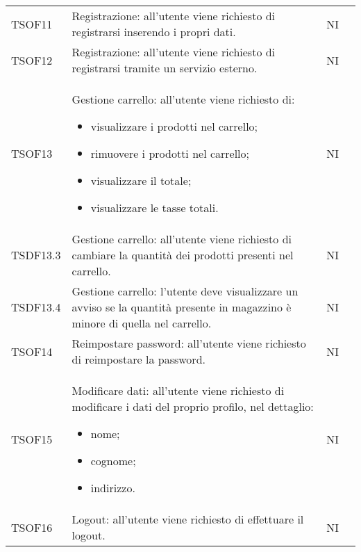 \begin{center}
\begin{longtable}[!h]{p{50px} p{245px} p{75px} p{50px}}
        TSOF11                           & Registrazione: all'utente viene richiesto di registrarsi inserendo i propri dati.                                                                                   & NI             \\
        TSOF12                           & Registrazione: all'utente viene richiesto di registrarsi tramite un servizio esterno.                                                                               & NI             \\
        TSOF13                           & Gestione carrello: all'utente viene richiesto di: \begin{itemize} \item visualizzare i prodotti nel carrello; \item rimuovere i prodotti nel carrello; \item visualizzare il totale; \item visualizzare le tasse totali. \end{itemize}                                                                                       & NI             \\
        TSDF13.3                         & Gestione carrello: all'utente viene richiesto di cambiare la quantità dei prodotti presenti nel carrello.                                                          & NI             \\
        TSDF13.4                         & Gestione carrello: l'utente deve visualizzare un avviso se la quantità presente in magazzino è minore di quella nel carrello.                                        & NI             \\
        TSOF14                           & Reimpostare password: all'utente viene richiesto di reimpostare la password.                                                                                        & NI             \\
        TSOF15                           & Modificare dati: all'utente viene richiesto di modificare i dati del proprio profilo, nel dettaglio: \begin{itemize} \item nome; \item cognome; \item indirizzo. \end{itemize}                                    & NI             \\
        TSOF16                           & Logout: all'utente viene richiesto di effettuare il logout.                                                                                                         & NI             \\

\end{longtable}
\end{center}

